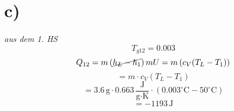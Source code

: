 

\section*{c)}
\begin{flushleft}
\textit{aus dem 1. HS}
\[
T_{g12} = 0.003
\]
\[
Q_{12} = m \left( \cancel{h_{L} - h_{1}} \right) mU = m \left( c_{V} (T_{L} - T_{1}) \right)
\]
\[
= m \cdot c_{V} (T_{L} - T_{1})
\]
\[
= 3.6 \, \text{g} \cdot 0.663 \, \frac{\text{J}}{\text{g} \cdot \text{K}} \cdot (0.003^\circ \text{C} - 50^\circ \text{C})
\]
\[
= -1193 \, \text{J}
\]
\end{flushleft}